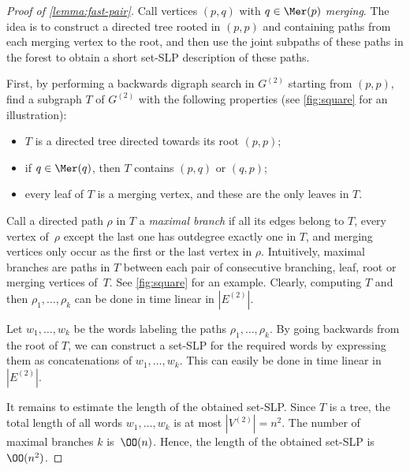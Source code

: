 \begin{proof}[Proof of \autoref{lemma:fast-pair}]
Call vertices $(p, q)$ with $q \in \Mer(p)$ \emph{merging}. The idea is to construct a directed tree rooted in $(p, p)$ and containing paths from each merging vertex to the root, and then use the joint subpaths of these paths in the forest to obtain a short set-SLP description of these paths.

First, by performing a backwards digraph search in $G^{(2)}$ starting from $(p, p)$, find a subgraph $T$ of $G^{(2)}$ with the following properties (see \autoref{fig:square} for an illustration):
\begin{itemize}
    \item $T$ is a directed tree directed towards its root $(p, p)$;

    \item if $q \in \Mer(q)$, then $T$ contains $(p, q)$ or $(q, p)$;

    \item every leaf of $T$ is a merging vertex, and these are the only leaves in $T$.
\end{itemize}

\noindent
Call a directed path $\rho$ in $T$ a \emph{maximal branch} if all its edges belong to $T$, every vertex of~$\rho$ except the last one has outdegree exactly one in $T$, and merging vertices only occur as the first or the last vertex in $\rho$. Intuitively, maximal branches are paths in $T$ between each pair of consecutive branching, leaf, root or merging vertices of~$T$. See \autoref{fig:square} for an example.
Clearly, computing $T$ and then $\rho_1, \ldots, \rho_k$ can be done in time linear in $|E^{(2)}|$.

Let $w_1, \ldots, w_k$ be the words labeling the paths $\rho_1, \ldots, \rho_k$. 
By going backwards from the root of $T$, we can construct a set-SLP for the required words by expressing them as concatenations of $w_1, \ldots, w_k$. This can easily be done in time linear in $|E^{(2)}|$.

It remains to estimate the length of the obtained set-SLP. Since $T$ is a tree, the total length of all words $w_1, \ldots, w_k$ is at most $|V^{(2)}| = n^2$. The number of maximal branches $k$ is~$\OO(n)$. Hence, the length of the obtained set-SLP is~$\OO(n^2)$.
\end{proof}

